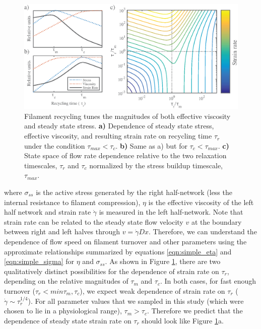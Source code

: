 \documentclass[10pt,letterpaper]{article}
\begin{document}
\begin{figure}[h!]
	\centering
	\includegraphics[width=\hsize]{figures/figure8}
	\caption{\label{fig:flow_theo}  Filament recycling tunes the magnitudes of both effective viscosity and steady state stress. \textbf{a)}  Dependence of steady state stress, effective viscosity, and resulting strain rate on recycling time $\tau_r$ under the condition $\tau_{max}<\tau_c$. \textbf{b)} Same as a) but for $\tau_c<\tau_{max}$.  \textbf{c)} State space of flow rate dependence relative to the two relaxation timescales, $\tau_r$ and $\tau_c$ normalized by the stress buildup timescale, $\tau_{max}$.  }
\end{figure}


where $\sigma_{ss}$ is the active stress generated by the right half-network (less the internal resistance to filament compression), $\eta$ is the effective viscosity of the left half network and strain rate $\dot{\gamma}$ is measured in the left half-network.  Note that strain rate can be related to the steady state flow velocity $v$ at the boundary between right and left halves through $ v = \dot{\gamma}Dx$. Therefore, we can understand the dependence of flow speed on filament turnover and other parameters using the approximate relationships summarized by equations \ref{eqn:simple_eta} and \ref{eqn:simple_sigma} for $\eta$ and $\sigma_{ss}$.  As shown in Figure \ref{fig:flow_theo}, there are two qualitatively distinct possibilities for the dependence of strain rate on $\tau_r$, depending on the relative magnitudes of $\tau_m$ and $\tau_c$.  In both cases, for fast enough turnover ($\tau_r < min \tau_m, \tau_c $), we expect weak dependence of strain rate on $\tau_r$ ($ \dot{\gamma}\sim \tau_r^{1/4}$).  For all parameter values that we sampled in this study (which were chosen to lie in a physiological range), $\tau_m > \tau_c$. Therefore we predict that the dependence of steady state strain rate on $\tau_r$ should look like Figure \ref{fig:flow_theo}a.
\end{document}
